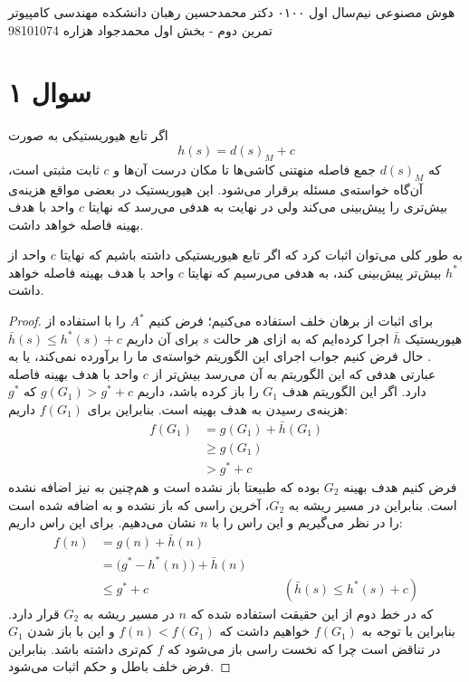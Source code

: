 \documentclass[a4paper, 11pt]{article}
\begin{document}
\handout
{هوش مصنوعی}
{نیم‌سال اول ۰۱\lr{-}۰۰}
{دکتر محمدحسین رهبان}
{دانشکده مهندسی کامپیوتر}
{تمرین دوم - بخش اول}
{محمدجواد هزاره}
{98101074}
\noindent
\\ [-5em]
\section*{سوال ۱}
اگر تابع هیوریستیکی به صورت 
\[
h(s) = d(s)_{M} + c
\]
که $d(s)_M$ جمع فاصله منهتنی کاشی‌ها تا مکان درست آن‌ها و $c$ ثابت مثبتی است، آن‌گاه خواسته‌ی مسئله برقرار می‌شود. این هیوریستیک در بعضی مواقع هزینه‌ی بیش‌تری را پیش‌بینی می‌کند ولی در نهایت به هدفی می‌رسد که نهایتا $c$ واحد با هدف بهینه فاصله خواهد داشت.

به طور کلی می‌توان اثبات کرد که اگر تابع هیوریستیکی داشته باشیم که نهایتا $c$ واحد از $h^*$ بیش‌تر پیش‌بینی کند، به هدفی می‌رسیم که نهایتا $c$ واحد با هدف بهینه فاصله خواهد داشت.

\begin{proof}
	برای اثبات از برهان خلف استفاده می‌کنیم؛ فرض کنیم $A^*$ را با استفاده از هیوریستیک $\bar{h}$ اجرا کرده‌ایم که به ازای هر حالت $s$ برای آن داریم
	$\bar{h}(s) \le h^*(s) + c$.
	حال فرض کنیم جواب اجرای این الگوریتم خواسته‌ی ما را برآورده نمی‌کند، یا به عبارتی هدفی که این الگوریتم به آن می‌رسد بیش‌تر از $c$ واحد با هدف بهینه فاصله دارد. اگر این الگوریتم هدف $G_1$ را باز کرده باشد، داریم
	$g(G_1) > g^* + c$
	که $g^*$ هزینه‌ی رسیدن به هدف بهینه است. بنابراین برای
	$f(G_1)$
	داریم:
	\[
	\begin{aligned}
		f(G_1)	&= g(G_1) + \bar{h}(G_1) \\
				&\ge g(G_1) \\
				&> g^* + c
	\end{aligned}
	\]
	 فرض کنیم هدف بهینه $G_2$ بوده که طبیعتا باز نشده است و هم‌چنین به  نیز اضافه نشده است. بنابراین در مسیر ریشه به $G_2$، آخرین راسی که باز نشده و به  اضافه شده است را در نظر می‌گیریم و این راس را با $n$ نشان می‌دهیم. برای این راس داریم:
	 \[
	 \begin{aligned}
	 	f(n)	&= g(n) + \bar{h}(n) \\
	 			&= \big(g^* - h^*(n)\big) + \bar{h}(n) \\
	 			&\le g^* + c &\qquad (\bar{h}(s) \le h^*(s) + c)
	 \end{aligned}
	 \]
	 که در خط دوم از این حقیقت استفاده شده که $n$ در مسیر ریشه به $G_2$ قرار دارد. بنابراین با توجه به $f(G_1)$ خواهیم داشت که 
	 $f(n) < f(G_1)$
	 و این با باز شدن $G_1$ در تناقض است چرا که نخست راسی باز می‌شود که $f$ کم‌تری داشته باشد. بنابراین فرض خلف باطل و حکم اثبات می‌شود.
\end{proof}
\end{document}
